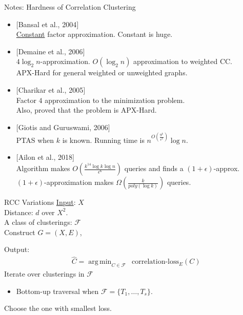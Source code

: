 \documentclass{beamer}
\newcommand{\mc}{\mathcal}
\DeclareMathOperator*{\argmin}{arg\,min}
\begin{document}
\begin{frame}[label=notesCCHardness]{Notes: Hardness of Correlation Clustering}
	\begin{itemize}
	\item $[$Bansal et al., 2004$]$\\
	\hyperlink{CC}{Constant} factor approximation. Constant is huge. 
	\item $[$Demaine et al., 2006$]$\\
	$4\log_2 n$-approximation. $O(\log_2 n)$ approximation to weighted CC.\\
	APX-Hard for general weighted or unweighted graphs.
	\item $[$Charikar et al., 2005$]$\\
	Factor $4$ approximation to the minimization problem.\\
	Also, proved that the problem is APX-Hard. 
	\item $[$Giotis and Guruswami, 2006$]$\\
	PTAS when $k$ is known. Running time is $n^{O(\frac{9^k}{\epsilon^2})}\log n$.	
	\item $[$Ailon et al., 2018$]$\\
	Algorithm makes $O(\frac{k^{14} \log k\log n}{\epsilon^6})$ queries  and finds a $(1+\epsilon)$-approx. \\
	$(1+\epsilon)$-approximation makes $\Omega(\frac{k}{poly(\log k)})$ queries. 
\end{itemize}
\end{frame}

\begin{frame}[label=RCCVariations]{RCC Variations}
	\hyperlink{RCC}{Input}: $X$\\
	Distance: $d$ over $X^2$.\\
	A class of clusterings: $\mc F$\\
	
	Construct $G = (X, E)$, 
	
	\vspace{10pt}Output: 
	\vspace{-10pt}\begin{align*}
	  &\hat C = \argmin_{C \in \mc F} \enspace \text{correlation-loss}_{E}(C)
	\end{align*}
	Iterate over clusterings in $\mc F$		
	\begin{itemize}
		\item Bottom-up traversal when $\mc F = \{T_1, \ldots, T_s\}$.
	\end{itemize}
	Choose the one with smallest loss.
\end{frame}
\end{document}

